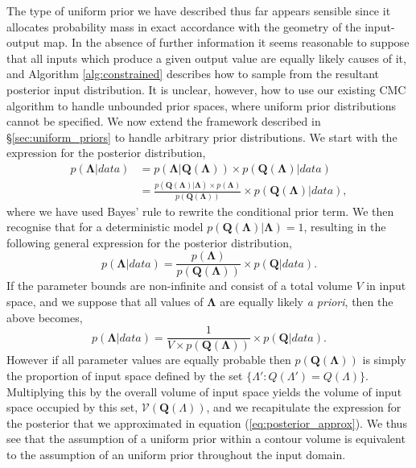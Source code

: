\documentclass[10pt,letterpaper]{article}
\begin{document}
The type of uniform prior we have described thus far appears sensible since it allocates probability mass in exact accordance with the geometry of the input-output map. In the absence of further information it seems reasonable to suppose that all inputs which produce a given output value are equally likely causes of it, and Algorithm \ref{alg:constrained} describes how to sample from the resultant posterior input distribution. It is unclear, however, how to use our existing CMC algorithm to handle unbounded prior spaces, where uniform prior distributions cannot be specified. We now extend the framework described in \S \ref{sec:uniform_priors} to handle arbitrary prior distributions. We start with the expression for the posterior distribution,
%
\begin{equation}
\begin{aligned}
p(\boldsymbol{\Lambda}|data) &= p(\boldsymbol{\Lambda}|\boldsymbol{Q}(\boldsymbol{\Lambda})) \times p(\boldsymbol{Q}(\boldsymbol{\Lambda})|data) \nonumber \\
&= \frac{p(\boldsymbol{Q}(\boldsymbol{\Lambda})|\boldsymbol{\Lambda})\times p(\boldsymbol{\Lambda})}{p(\boldsymbol{Q}(\boldsymbol{\Lambda}))}\times p(\boldsymbol{Q}(\boldsymbol{\Lambda})|data),
\end{aligned}
\end{equation}
%
where we have used Bayes' rule to rewrite the conditional prior term. We then recognise that for a deterministic model $p(\boldsymbol{Q}(\boldsymbol{\Lambda})|\boldsymbol{\Lambda}) = 1$, resulting in the following general expression for the posterior distribution,
%
\begin{equation}\label{eq:posterior_general}
p(\boldsymbol{\Lambda}|data) = \frac{p(\boldsymbol{\Lambda})}{p(\boldsymbol{Q}(\boldsymbol{\Lambda}))}\times p(\boldsymbol{Q}|data).
\end{equation}
%
If the parameter bounds are non-infinite and consist of a total volume $V$ in input space, and we suppose that all values of $\boldsymbol{\Lambda}$ are equally likely \textit{a priori}, then the above becomes,
%
\begin{equation}
p(\boldsymbol{\Lambda}|data) = \frac{1}{V\times p(\boldsymbol{Q}(\boldsymbol{\Lambda}))}\times p(\boldsymbol{Q}|data).
\end{equation}
%
However if all parameter values are equally probable then $p(\boldsymbol{Q}(\boldsymbol{\Lambda}))$ is simply the proportion of input space defined by the set $\{\Lambda': Q(\Lambda') = Q(\Lambda)\}$. Multiplying this by the overall volume of input space yields the volume of input space occupied by this set, $\mathcal{V}(\boldsymbol{Q}(\Lambda))$, and we recapitulate the expression for the posterior that we approximated in equation (\ref{eq:posterior_approx}). We thus see that the assumption of a uniform prior within a contour volume is equivalent to the assumption of an uniform prior throughout the input domain.
\end{document}
